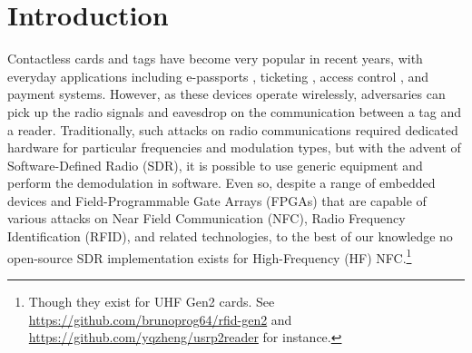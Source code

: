 \documentclass[fleqn,10pt]{SelfArx} %
\affiliation{\textsuperscript{1}\textit{CDT in Cyber Security, University of Oxford, Oxford, United Kingdom}} %
\begin{document}

\flushbottom %

\maketitle %

\tableofcontents %

\thispagestyle{empty} %


\section{Introduction}
\label{sec:introduction}

Contactless cards and tags have become very popular in recent years, with everyday applications including e-passports \cite{epassports}, ticketing \cite{mbta, chipkaart, classicvulnerabilities}, access control \cite{imperial}, and payment \cite{relay, practicalrelay} systems. However, as these devices operate wirelessly, adversaries can pick up the radio signals and eavesdrop on the communication between a tag and a reader. Traditionally, such attacks on radio communications required dedicated hardware for particular frequencies and modulation types, but with the advent of Software-Defined Radio (SDR), it is possible to use generic equipment and perform the demodulation in software. Even so, despite a range of embedded devices and Field-Programmable Gate Arrays (FPGAs) that are capable of various attacks on Near Field Communication (NFC), Radio Frequency Identification (RFID), and related technologies, to the best of our knowledge no open-source SDR implementation exists for High-Frequency (HF) NFC.\footnote{Though they exist for UHF Gen2 cards. See \url{https://github.com/brunoprog64/rfid-gen2} and \url{https://github.com/yqzheng/usrp2reader} for instance.} 
\end{document}
